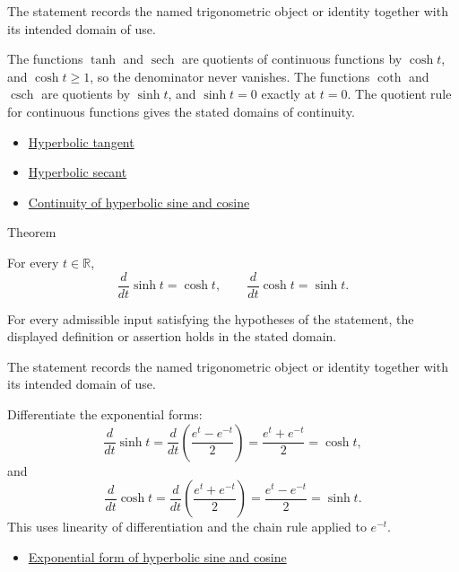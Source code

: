 \begin{remark*}[Interpretation]
The statement records the named trigonometric object or identity together with
its intended domain of use.
\end{remark*}

\begin{remark*}[Proof]
The functions $\tanh$ and $\operatorname{sech}$ are quotients of continuous
functions by $\cosh t$, and $\cosh t\geq 1$, so the denominator never
vanishes. The functions $\operatorname{coth}$ and $\operatorname{csch}$ are
quotients by $\sinh t$, and $\sinh t=0$ exactly at $t=0$. The quotient rule
for continuous functions gives the stated domains of continuity.
\end{remark*}
\begin{dependencies}
\begin{itemize}
  \item \hyperref[def:hyperbolic-tangent]{Hyperbolic tangent}
  \item \hyperref[def:hyperbolic-secant]{Hyperbolic secant}
  \item \hyperref[thm:hyperbolic-sinh-cosh-continuous]{Continuity of hyperbolic sine and cosine}
\end{itemize}
\end{dependencies}

\begin{theorembox}{Theorem}
\begin{theorem}
\label{thm:hyperbolic-sinh-cosh-derivatives}
For every $t\in\mathbb{R}$,
\[
  \frac{d}{dt}\sinh t=\cosh t,
  \qquad
  \frac{d}{dt}\cosh t=\sinh t.
\]
\end{theorem}
\end{theorembox}
\begin{remark*}
For every admissible input satisfying the hypotheses of the statement, the
displayed definition or assertion holds in the stated domain.
\end{remark*}

\begin{remark*}[Interpretation]
The statement records the named trigonometric object or identity together with
its intended domain of use.
\end{remark*}

\begin{remark*}[Proof]
Differentiate the exponential forms:
\[
  \frac{d}{dt}\sinh t
  =\frac{d}{dt}\left(\frac{e^t-e^{-t}}{2}\right)
  =\frac{e^t+e^{-t}}{2}
  =\cosh t,
\]
and
\[
  \frac{d}{dt}\cosh t
  =\frac{d}{dt}\left(\frac{e^t+e^{-t}}{2}\right)
  =\frac{e^t-e^{-t}}{2}
  =\sinh t.
\]
This uses linearity of differentiation and the chain rule applied to
$e^{-t}$.
\end{remark*}
\begin{dependencies}
\begin{itemize}
  \item \hyperref[thm:hyperbolic-exponential-form]{Exponential form of hyperbolic sine and cosine}
\end{itemize}
\end{dependencies}

